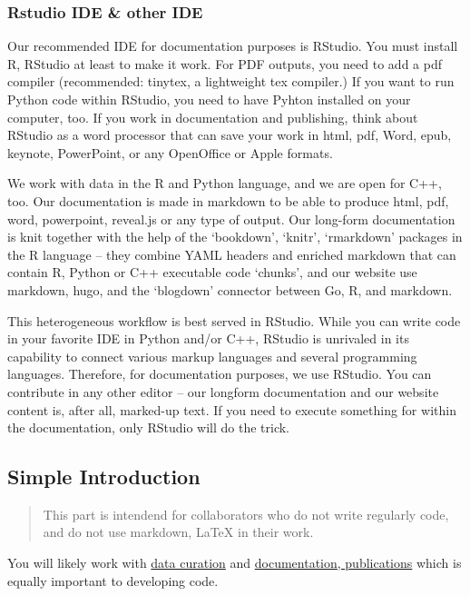 \documentclass[
  fontsize=13pt,
  english,
  a4paper,
  openany, a4paper, oneside]{article}
\begin{document}
\hypertarget{rstudio-ide-other-ide}{%
\subsubsection{Rstudio IDE \& other IDE}\label{rstudio-ide-other-ide}}

Our recommended IDE for documentation purposes is RStudio. You must install R, RStudio at least to make it work. For PDF outputs, you need to add a pdf compiler (recommended: tinytex, a lightweight tex compiler.) If you want to run Python code within RStudio, you need to have Pyhton installed on your computer, too. If you work in documentation and publishing, think about RStudio as a word processor that can save your work in html, pdf, Word, epub, keynote, PowerPoint, or any OpenOffice or Apple formats.

We work with data in the R and Python language, and we are open for C++, too. Our documentation is made in markdown to be able to produce html, pdf, word, powerpoint, reveal.js or any type of output. Our long-form documentation is knit together with the help of the `bookdown', `knitr', `rmarkdown' packages in the R language -- they combine YAML headers and enriched markdown that can contain R, Python or C++ executable code `chunks', and our website use markdown, hugo, and the `blogdown' connector between Go, R, and markdown.

This heterogeneous workflow is best served in RStudio. While you can write code in your favorite IDE in Python and/or C++, RStudio is unrivaled in its capability to connect various markup languages and several programming languages. Therefore, for documentation purposes, we use RStudio. You can contribute in any other editor -- our longform documentation and our website content is, after all, marked-up text. If you need to execute something for within the documentation, only RStudio will do the trick.

\hypertarget{simple-intro}{%
\subsection{Simple Introduction}\label{simple-intro}}

\begin{quote}
This part is intendend for collaborators who do not write regularly code, and do not use markdown, LaTeX in their work.
\end{quote}

You will likely work with \protect\hyperlink{data-curation}{data curation} and \protect\hyperlink{documentation}{documentation, publications} which is equally important to developing code.
\end{document}
